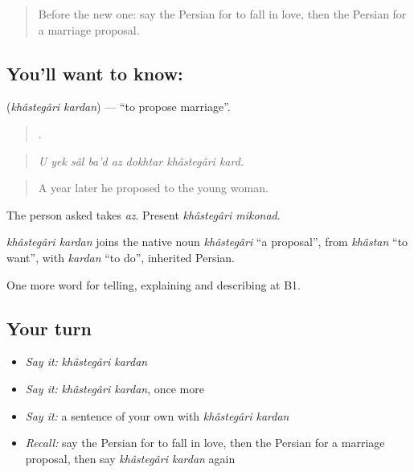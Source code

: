 \label{lesson:FA-C334-khastegari-kardan}



\begin{quote}
Before the new one: say the Persian for to fall in love, then the Persian for a marriage proposal.
\end{quote}

\subsection*{You'll want to know:  }
\textbf{ } (\emph{khâstegâri kardan}) — \textquotedblleft{}to propose marriage\textquotedblright{}.

\begin{quote}
       .
\end{quote}

\begin{quote}
\emph{U yek sâl ba'd az dokhtar khâstegâri kard.}
\end{quote}

\begin{quote}
A year later he proposed to the young woman.
\end{quote}

The person asked takes \emph{az}. Present \emph{khâstegâri mikonad}.

\begin{cousinweb}
\emph{khâstegâri kardan} joins the native noun \emph{khâstegâri} \textquotedblleft{}a proposal\textquotedblright{}, from \emph{khâstan} \textquotedblleft{}to want\textquotedblright{}, with \emph{kardan} \textquotedblleft{}to do\textquotedblright{}, inherited Persian.
\end{cousinweb}

\begin{grammarlens}[title={What you've built}]
One more word for telling, explaining and describing at B1.
\end{grammarlens}

\subsection*{Your turn}
\begin{itemize}
\raggedright
  \item \emph{Say it:} \emph{khâstegâri kardan}
  \item \emph{Say it:} \emph{khâstegâri kardan}, once more
  \item \emph{Say it:} a sentence of your own with \emph{khâstegâri kardan}
  \item \emph{Recall:} say the Persian for to fall in love, then the Persian for a marriage proposal, then say \emph{khâstegâri kardan} again
\end{itemize}


